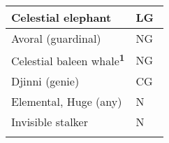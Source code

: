 \begin{longtable}{llll}
\hline
\multicolumn{1}{|p{3.326in}|}{\begin{minipage}[t]{3.326in}\raggedright
Celestial elephant\end{minipage}} & \multicolumn{3}{p{0.601in}|}{\begin{minipage}[t]{0.601in}\raggedright
LG\end{minipage}}\\
\hline
\multicolumn{1}{|p{3.326in}|}{\begin{minipage}[t]{3.326in}\raggedright
Avoral (guardinal)\end{minipage}} & \multicolumn{3}{p{0.601in}|}{\begin{minipage}[t]{0.601in}\raggedright
NG\end{minipage}}\\
\hline
\multicolumn{1}{|p{3.326in}|}{\begin{minipage}[t]{3.326in}\raggedright
Celestial baleen whale\textsuperscript{\textbf{1}}\end{minipage}} & \multicolumn{3}{p{0.601in}|}{\begin{minipage}[t]{0.601in}\raggedright
NG\end{minipage}}\\
\hline
\multicolumn{1}{|p{3.326in}|}{\begin{minipage}[t]{3.326in}\raggedright
Djinni (genie)\end{minipage}} & \multicolumn{3}{p{0.601in}|}{\begin{minipage}[t]{0.601in}\raggedright
CG\end{minipage}}\\
\hline
\multicolumn{1}{|p{3.326in}|}{\begin{minipage}[t]{3.326in}\raggedright
Elemental, Huge (any)\end{minipage}} & \multicolumn{3}{p{0.601in}|}{\begin{minipage}[t]{0.601in}\raggedright
N\end{minipage}}\\
\hline
\multicolumn{1}{|p{3.326in}|}{\begin{minipage}[t]{3.326in}\raggedright
Invisible stalker\end{minipage}} & \multicolumn{3}{p{0.601in}|}{\begin{minipage}[t]{0.601in}\raggedright
N\end{minipage}}\\
\hline
\multicolumn{1}{|p{3.326in}|}{\begin{minipage}[t]{3.326in}\raggedright

\end{minipage}}
\end{longtable}

